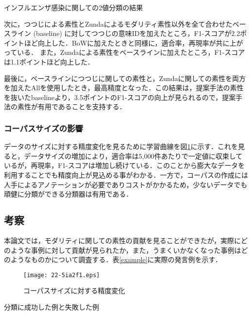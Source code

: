 \documentclass[japanese]{jnlp_1.4}
\begin{document}
\begin{table}[t]
\caption{インフルエンザ感染に関しての2値分類の結果}
\label{result}

\end{table}

次に，つつじによる素性とZundaによるモダリティ素性以外を全て合わせたベースライン (baseline) に対してつつじの意味IDを加えたところ，F1-スコアが2.2ポイントほど向上した．BoWに加えたときと同様に，適合率，再現率が共に上がっている．
また，Zundaによる素性をベースラインに加えたところ，F1-スコアは1.1ポイントほど向上した．

最後に，ベースラインにつつじに関しての素性と，Zundaに関しての素性を両方を加えたAllを使用したとき，最高精度となった．この結果は，提案手法の素性を抜いたbaselineより，3.5ポイントのF1-スコアの向上が見られるので，提案手法の素性が有用であることを支持する．


\subsubsection{コーパスサイズの影響}

データのサイズに対する精度変化を見るために学習曲線を図\ref{learning_curve}に示す．これを見ると，データサイズの増加により，適合率は5,000件あたりで一定値に収束しているが，再現率，F1-スコアは増加し続けている．このことから膨大なデータを利用することでも精度向上が見込める事がわかる．一方で，コーパスの作成には人手によるアノテーションが必要でありコストがかかるため，少ないデータでも頑健に分類ができる分類器は有用である．

 \subsection{考察}

本論文では，モダリティに関しての素性の貢献を見ることができたが，実際にどのような事例に対して貢献が見られたか，また，うまくいかなくなった事例はどのようなものかについて調査する．表\ref{example}に実際の発言例を示す．

 \begin{figure}[t]
  \begin{center}
  \texttt{[image: 22-5ia2f1.eps]}
 \end{center}
  \caption{コーパスサイズに対する精度変化}
  \label{learning_curve}
\end{figure}
\begin{table}[t]
\caption{分類に成功した例と失敗した例}
\label{example}

\end{table}
\end{document}
